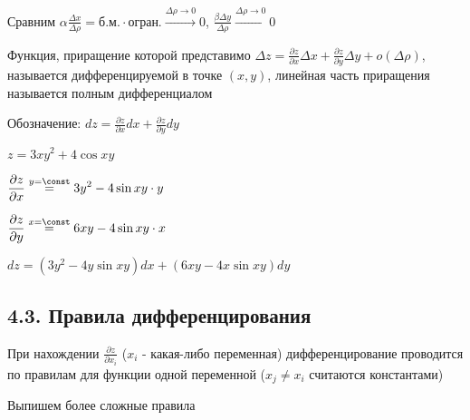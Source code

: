 \documentclass[12pt]{article}
\begin{document}
    Сравним $\displaystyle \alpha \frac{\Delta x}{\Delta \rho} = \text{б.м.} \cdot \text{огран.} \stackrel{\Delta \rho \to 0}{\to} 0$, $\displaystyle \frac{\beta \Delta y}{\Delta \rho} \stackrel{\Delta \rho \to 0}{\to} 0$

    Функция, приращение которой представимо $\displaystyle \Delta z = \frac{\partial z}{\partial x}\Delta x + \frac{\partial z}{\partial y}\Delta y + o(\Delta \rho)$, называется дифференцируемой в точке $\displaystyle (x, y)$,
    линейная часть приращения называется полным дифференциалом

    Обозначение: $\displaystyle dz = \frac{\partial z}{\partial x} dx + \frac{\partial z}{\partial y} dy$

    \Ex $\displaystyle z = 3xy^2 + 4\cos xy$

    $\displaystyle \frac{\partial z}{\partial x} \stackrel{y = \const}{=} 3y^2 - 4\sin xy \cdot y$

    $\displaystyle \frac{\partial z}{\partial y} \stackrel{x = \const}{=} 6xy - 4\sin xy \cdot x$

    $\displaystyle dz = (3y^2 - 4y \sin xy)dx + (6xy - 4x \sin xy)dy$

    \subsection{4.3. Правила дифференцирования}

    \Nota При нахождении $\displaystyle \frac{\partial z}{\partial x_i}$ ($x_i$ - какая-либо переменная) дифференцирование проводится по правилам для функции одной переменной ($x_j \neq x_i$ считаются константами)

    Выпишем более сложные правила

    \hypertarget{derivativeofcomplexfunctionoftwovariables}{}
\end{document}
